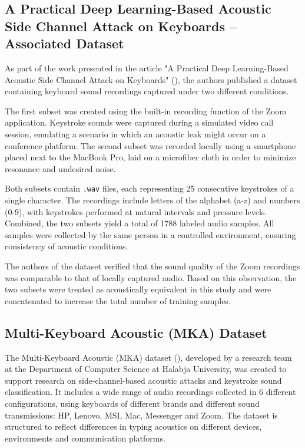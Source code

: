 \documentclass[a4paper,11pt,twoside]{report}
\theoremstyle{definition}
\begin{document}
\subsection{A Practical Deep Learning-Based Acoustic Side Channel Attack on Keyboards – Associated Dataset \protect\footnotemark}
\label{practicalDataset}



As part of the work presented in the article "A Practical Deep Learning-Based Acoustic Side Channel Attack on Keyboards" (\textit{\cite{CoAtNet2023}}), the authors published a dataset containing keyboard sound recordings captured under two different conditions.

The first subset was created using the built-in recording function of the Zoom application. Keystroke sounds were captured during a simulated video call session, emulating a scenario in which an acoustic leak might occur on a conference platform. The second subset was recorded locally using a smartphone placed next to the MacBook Pro, laid on a microfiber cloth in order to minimize resonance and undesired noise.

Both subsets contain \texttt{.wav} files, each representing 25 consecutive keystrokes of a single character. The recordings include letters of the alphabet (a-z) and numbers (0-9), with keystrokes performed at natural intervals and pressure levels. Combined, the two subsets yield a total of 1788 labeled audio samples. All samples were collected by the same person in a controlled environment, ensuring consistency of acoustic conditions.

The authors of the dataset verified that the sound quality of the Zoom recordings was comparable to that of locally captured audio. Based on this observation, the two subsets were treated as acoustically equivalent in this study and were concatenated to increase the total number of training samples.


\subsection{Multi-Keyboard Acoustic (MKA) Dataset \protect\footnotemark}
\label{mkaDataset}


The Multi-Keyboard Acoustic (MKA) dataset (\textit{\cite{mka_dataset}}), developed by a research team at the Department of Computer Science at Halabja University, was created to support research on side-channel-based acoustic attacks and keystroke sound classification. It includes a wide range of audio recordings collected in 6 different configurations, using keyboards of different brands and different sound transmissions: HP, Lenovo, MSI, Mac, Messenger and Zoom. The dataset is structured to reflect differences in typing acoustics on different devices, environments and communication platforms.
\end{document}
